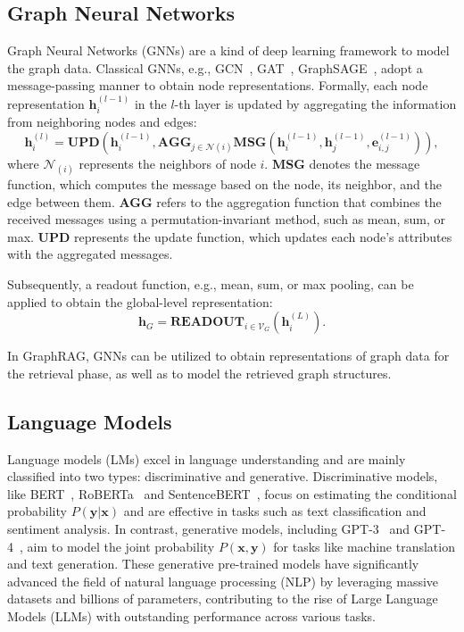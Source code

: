 \documentclass[acmsmall]{acmart}
\begin{document}
\subsection{Graph Neural Networks}
Graph Neural Networks (GNNs) are a kind of deep learning framework to model the graph data. Classical GNNs, e.g., GCN~\cite{ref:gcn}, GAT~\cite{ref:gat}, GraphSAGE~\cite{ref:graphsage}, adopt a message-passing manner to obtain node representations. Formally, each node representation $\mathbf{h}^{(l-1)}_i$ in the $l$-th layer is updated by aggregating the information from neighboring nodes and edges:
\begin{equation}
    \mathbf{h}^{(l)}_i = \textbf{UPD}(\mathbf{h}^{(l-1)}_i, \textbf{AGG}_{j \in \mathcal{N}(i)}\textbf{MSG}(\mathbf{h}^{(l-1)}_i,\mathbf{h}^{(l-1)}_j, \mathbf{e}^{(l-1)}_{i,j})),
\end{equation}
where $\mathcal{N}_{(i)}$ represents the neighbors of node $i$. \textbf{MSG} denotes the message function, which computes the message based on the node, its neighbor, and the edge between them. \textbf{AGG} refers to the aggregation function that combines the received messages using a permutation-invariant method, such as mean, sum, or max. \textbf{UPD} represents the update function, which updates each node's attributes with the aggregated messages.

Subsequently, a readout function, e.g., mean, sum, or max pooling, can be applied to obtain the global-level representation:
\begin{equation}
    \mathbf{h}_G = \textbf{READOUT}_{i \in \mathcal{V}_G}(\mathbf{h}_i^{(L)}).
\end{equation}

In GraphRAG, GNNs can be utilized to obtain representations of graph data for the retrieval phase, as well as to model the retrieved graph structures.

\subsection{Language Models}
Language models (LMs) excel in language understanding and are mainly classified into two types: discriminative and generative. Discriminative models, like BERT~\cite{ref:bert}, RoBERTa~\cite{ref:roberta} and SentenceBERT~\cite{ref:sentence-bert}, focus on estimating the conditional probability \( P(\mathbf{y}|\mathbf{x}) \) and are effective in tasks such as text classification and sentiment analysis. In contrast, generative models, including GPT-3~\cite{ref:gpt3} and GPT-4~\cite{ref:gpt4}, aim to model the joint probability \( P(\mathbf{x},\mathbf{y}) \) for tasks like machine translation and text generation. These generative pre-trained models have significantly advanced the field of natural language processing (NLP) by leveraging massive datasets and billions of parameters, contributing to the rise of Large Language Models (LLMs) with outstanding performance across various tasks.
\end{document}
